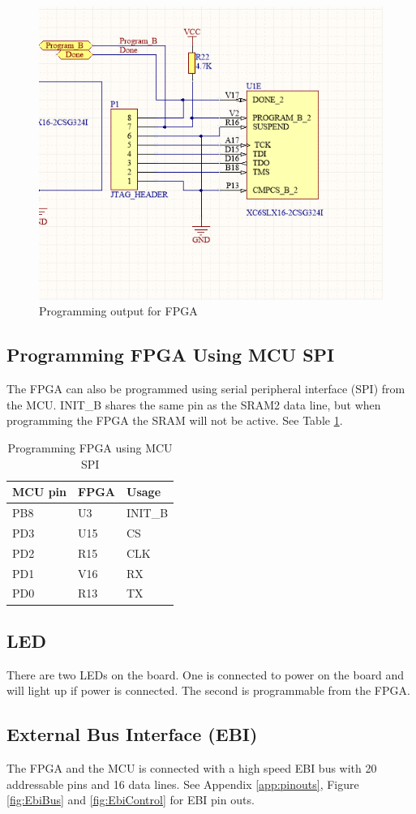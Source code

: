 \begin{figure}
    \includegraphics[width=\linewidth]{img/FPGA_Programmer}
    \caption{Programming output for FPGA}
    \label{fig:FpgaProgrammer}
\end{figure}

\subsection{Programming FPGA Using MCU SPI}
The FPGA can also be programmed using serial peripheral interface (SPI) from the MCU.
INIT\_B shares the same pin as the SRAM2 data line, but when programming the FPGA the SRAM will not be active.
See Table \ref{tab:SpiProgrammer}.

\begin{table}[]
    \centering
    \begin{tabular}{lll}
        MCU pin & FPGA & Usage   \\
        \hline
        PB8     & U3   & INIT\_B \\
        PD3     & U15  & CS      \\
        PD2     & R15  & CLK     \\
        PD1     & V16  & RX      \\
        PD0     & R13  & TX
    \end{tabular}
    \caption{Programming FPGA using MCU SPI}
    \label{tab:SpiProgrammer}
\end{table}

\subsection{LED}
There are two LEDs on the board.
One is connected to power on the board and will light up if power is connected.
The second is programmable from the FPGA.

\subsection{External Bus Interface (EBI)}
The FPGA and the MCU is connected with a high speed EBI bus with 20 addressable pins and 16 data lines.
See Appendix \ref{app:pinouts}, Figure \ref{fig:EbiBus} and \ref{fig:EbiControl} for EBI pin outs.

